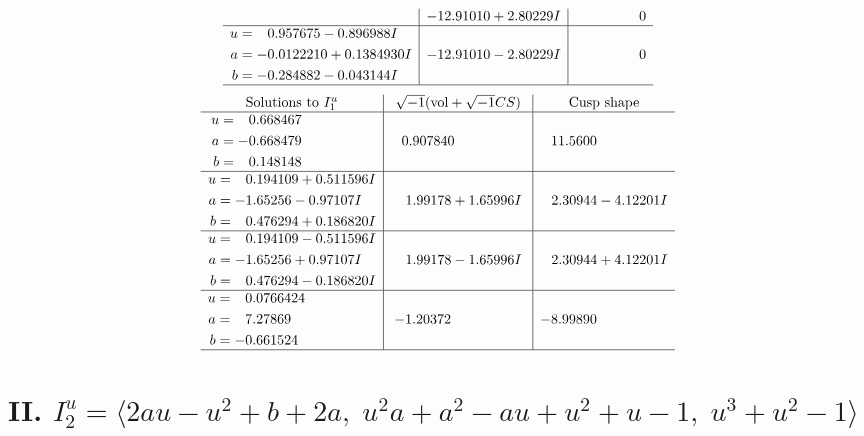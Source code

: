 \documentclass[1p]{elsarticle_modified}
\theoremstyle{definition}
\newcommand{\I}{\sqrt{-1}}
\begin{document}
$$\begin{array}{c|c|c}
 & -12.91010 + 2.80229 I & \phantom{-0.000000 } 0 \\ \hline\begin{aligned}
u &= \phantom{-}0.957675 - 0.896988 I \\
a &= -0.0122210 + 0.1384930 I \\
b &= -0.284882 - 0.043144 I\end{aligned}
 & -12.91010 - 2.80229 I & \phantom{-0.000000 } 0\\
 \hline 
 \end{array}$$\newpage$$\begin{array}{c|c|c}  
\text{Solutions to }I^u_{1}& \I (\text{vol} + \sqrt{-1}CS) & \text{Cusp shape}\\
 \hline 
\begin{aligned}
u &= \phantom{-}0.668467\phantom{ +0.000000I} \\
a &= -0.668479\phantom{ +0.000000I} \\
b &= \phantom{-}0.148148\phantom{ +0.000000I}\end{aligned}
 & \phantom{-}0.907840\phantom{ +0.000000I} & \phantom{-}11.5600\phantom{ +0.000000I} \\ \hline\begin{aligned}
u &= \phantom{-}0.194109 + 0.511596 I \\
a &= -1.65256 - 0.97107 I \\
b &= \phantom{-}0.476294 + 0.186820 I\end{aligned}
 & \phantom{-}1.99178 + 1.65996 I & \phantom{-}2.30944 - 4.12201 I \\ \hline\begin{aligned}
u &= \phantom{-}0.194109 - 0.511596 I \\
a &= -1.65256 + 0.97107 I \\
b &= \phantom{-}0.476294 - 0.186820 I\end{aligned}
 & \phantom{-}1.99178 - 1.65996 I & \phantom{-}2.30944 + 4.12201 I \\ \hline\begin{aligned}
u &= \phantom{-}0.0766424\phantom{ +0.000000I} \\
a &= \phantom{-}7.27869\phantom{ +0.000000I} \\
b &= -0.661524\phantom{ +0.000000I}\end{aligned}
 & -1.20372\phantom{ +0.000000I} & -8.99890\phantom{ +0.000000I}\\
 \hline 
 \end{array}$$\newpage\newpage\renewcommand{\arraystretch}{1}
\centering \section*{II. $I^u_{2}= \langle 2 a u- u^2+b+2 a,\;u^2 a+a^2- a u+u^2+u-1,\;u^3+u^2-1 \rangle$}
\end{document}
